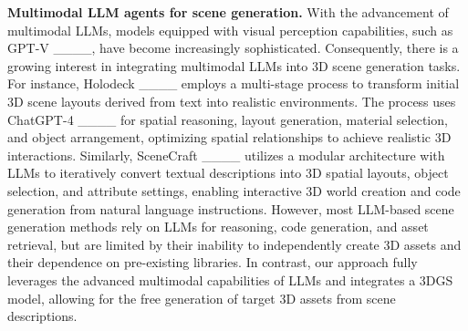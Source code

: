 \textbf{Multimodal LLM agents for scene generation.} With the advancement of multimodal LLMs, models equipped with visual perception capabilities, such as GPT-V ____, have become increasingly sophisticated. Consequently, there is a growing interest in integrating multimodal LLMs into 3D scene generation tasks. For instance, Holodeck ____ employs a multi-stage process to transform initial 3D scene layouts derived from text into realistic environments. The process uses ChatGPT-4 ____ for spatial reasoning, layout generation, material selection, and object arrangement, optimizing spatial relationships to achieve realistic 3D interactions. Similarly, SceneCraft ____ utilizes a modular architecture with LLMs to iteratively convert textual descriptions into 3D spatial layouts, object selection, and attribute settings, enabling interactive 3D world creation and code generation from natural language instructions. However, most LLM-based scene generation methods rely on LLMs for reasoning, code generation, and asset retrieval, but are limited by their inability to independently create 3D assets and their dependence on pre-existing libraries. In contrast, our approach fully leverages the advanced multimodal capabilities of LLMs and integrates a 3DGS model, allowing for the free generation of target 3D assets from scene descriptions.
